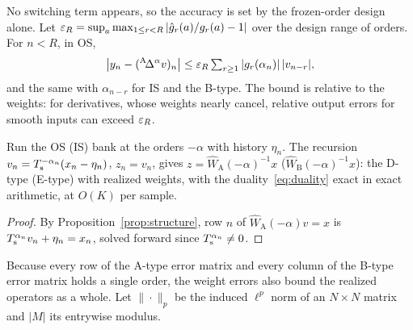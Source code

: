 No switching term appears, so the accuracy is set by the frozen-order design alone. Let $\varepsilon_R=\sup_a\max_{1\le r<R}|\hat g_r(a)/g_r(a)-1|$ over the design range of orders. For $n<R$, in OS,
\begin{equation}
\big|y_n-({}^{\mathrm{A}}\!\Delta^{\alpha}v)_n\big|\le\varepsilon_R\textstyle\sum_{r\ge1}|g_r(\alpha_n)|\,|v_{n-r}|,\label{eq:bound}
\end{equation}
and the same with $\alpha_{n-r}$ for IS and the B-type. The bound is relative to the weights: for derivatives, whose weights nearly cancel, relative output errors for smooth inputs can exceed $\varepsilon_R$.

\begin{proposition}\label{prop:inverse}
Run the OS (IS) bank at the orders $-\alpha$ with history $\eta_n$. The recursion $v_n=T_{\mathrm{s}}^{-\alpha_n}(x_n-\eta_n)$, $z_n=v_n$, gives $z=\hat W_{\mathrm A}(-\alpha)^{-1}x$ ($\hat W_{\mathrm B}(-\alpha)^{-1}x$): the D-type (E-type) with realized weights, with the duality~\eqref{eq:duality} exact in exact arithmetic, at $O(K)$ per sample.
\end{proposition}
\begin{proof}
By Proposition~\ref{prop:structure}, row $n$ of $\hat W_{\mathrm A}(-\alpha)v=x$ is $T_{\mathrm{s}}^{\alpha_n}v_n+\eta_n=x_n$, solved forward since $T_{\mathrm{s}}^{\alpha_n}\neq0$.
\end{proof}

Because every row of the A-type error matrix and every column of the B-type error matrix holds a single order, the weight errors also bound the realized operators as a whole. Let $\|\cdot\|_p$ be the induced $\ell^p$ norm of an $N\times N$ matrix and $|M|$ its entrywise modulus.

